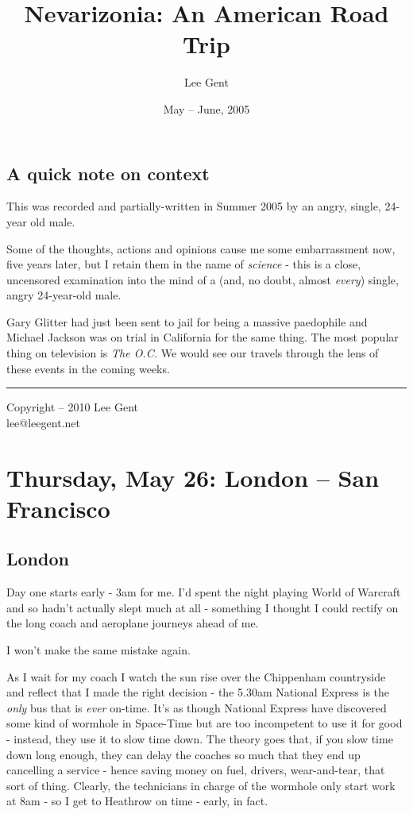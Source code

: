 \documentclass[a5paper,titlepage,11pt]{book}
\title{Nevarizonia: An American Road Trip}
\author{Lee Gent}
\date{May -- June, 2005}
\begin{document}
\frontmatter
\maketitle

\pagestyle{plain}
\tableofcontents
\section*{A quick note on context}
This was recorded and partially-written in Summer 2005 by an angry, single, 24-year old male.

Some of the thoughts, actions and opinions cause me some embarrassment now, five years later, but I retain them in the name of \emph{science} - this is a close, uncensored examination into the mind of a (and, no doubt, almost \emph{every}) single, angry 24-year-old male.

Gary Glitter had just been sent to jail for being a massive paedophile and Michael Jackson was on trial in California for the same thing.  The most popular thing on television is \emph{The O.C.}  We would see our travels through the lens of these events in the coming weeks.

\vfill
\hrule
\begin{center} {\scriptsize Copyright  -- 2010 Lee Gent \\ lee@leegent.net }  \end{center}

\mainmatter
\chapter[London -- San Francisco]{Thursday, May 26: London -- San Francisco}
\section*{London}
Day one starts early - 3am for me.  I'd spent the night playing World of Warcraft and so hadn't actually slept much at all - something I thought I could rectify on the long coach and aeroplane journeys ahead of me.

I won't make the same mistake again.

As I wait for my coach I watch the sun rise over the Chippenham countryside and reflect that I made the right decision - the 5.30am National Express is the \emph{only} bus that is \emph{ever} on-time.  It's as though National Express have discovered some kind of wormhole in Space-Time but are too incompetent to use it for good - instead, they use it to slow time down.  The theory goes that, if you slow time down long enough, they can delay the coaches so much that they end up cancelling a service - hence saving money on fuel, drivers, wear-and-tear, that sort of thing.  Clearly, the technicians in charge of the wormhole only start work at 8am - so I get to Heathrow on time - early, in fact.
\end{document}
